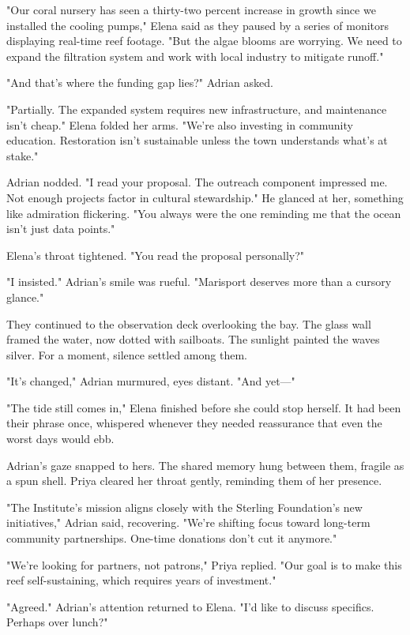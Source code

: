 "Our coral nursery has seen a thirty-two percent increase in growth since we installed the cooling pumps," Elena said as they paused by a series of monitors displaying real-time reef footage. "But the algae blooms are worrying. We need to expand the filtration system and work with local industry to mitigate runoff."

"And that's where the funding gap lies?" Adrian asked.

"Partially. The expanded system requires new infrastructure, and maintenance isn't cheap." Elena folded her arms. "We're also investing in community education. Restoration isn't sustainable unless the town understands what's at stake."

Adrian nodded. "I read your proposal. The outreach component impressed me. Not enough projects factor in cultural stewardship." He glanced at her, something like admiration flickering. "You always were the one reminding me that the ocean isn't just data points."

Elena's throat tightened. "You read the proposal personally?"

"I insisted." Adrian's smile was rueful. "Marisport deserves more than a cursory glance."

They continued to the observation deck overlooking the bay. The glass wall framed the water, now dotted with sailboats. The sunlight painted the waves silver. For a moment, silence settled among them.

"It's changed," Adrian murmured, eyes distant. "And yet—"

"The tide still comes in," Elena finished before she could stop herself. It had been their phrase once, whispered whenever they needed reassurance that even the worst days would ebb.

Adrian's gaze snapped to hers. The shared memory hung between them, fragile as a spun shell. Priya cleared her throat gently, reminding them of her presence.

"The Institute's mission aligns closely with the Sterling Foundation's new initiatives," Adrian said, recovering. "We're shifting focus toward long-term community partnerships. One-time donations don't cut it anymore."

"We're looking for partners, not patrons," Priya replied. "Our goal is to make this reef self-sustaining, which requires years of investment."

"Agreed." Adrian's attention returned to Elena. "I'd like to discuss specifics. Perhaps over lunch?"

